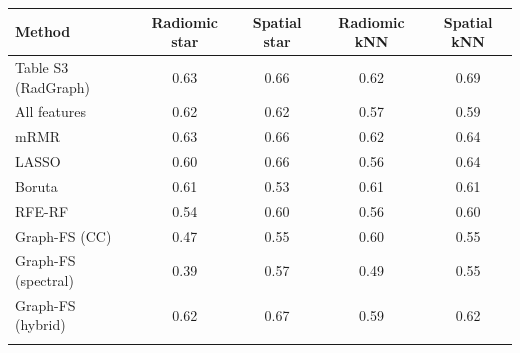 \begin{tabular}{@{}lcccc@{}}
\toprule
Method & Radiomic star & Spatial star & Radiomic kNN & Spatial kNN \\
\midrule
Table S3 (RadGraph) & 0.63 & 0.66 & 0.62 & 0.69 \\
All features & 0.62 & 0.62 & 0.57 & 0.59 \\
mRMR & 0.63 & 0.66 & 0.62 & 0.64 \\
LASSO & 0.60 & 0.66 & 0.56 & 0.64 \\
Boruta & 0.61 & 0.53 & 0.61 & 0.61 \\
RFE-RF & 0.54 & 0.60 & 0.56 & 0.60 \\
Graph-FS (CC) & 0.47 & 0.55 & 0.60 & 0.55 \\
Graph-FS (spectral) & 0.39 & 0.57 & 0.49 & 0.55 \\
Graph-FS (hybrid) & 0.62 & 0.67 & 0.59 & 0.62 \\
\botrule
\end{tabular}
